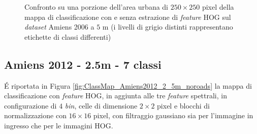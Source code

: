 \begin{figure}[!ht]

\center


\hspace{2mm}


\caption{Confronto su una porzione dell'area urbana di $250\times250$
pixel della mappa di classificazione con e senza estrazione di
\emph{feature} HOG sul \emph{dataset} Amiens 2006 a $5$ m (i livelli di grigio distinti rappresentano etichette di classi differenti)}

\label{fig:confrontoAmiens2006_5m}

\end{figure}

\clearpage





\subsection{Amiens 2012 - 2.5m - 7 classi}

\'E riportata in Figura \ref{fig:ClassMap_Amiens2012_2_5m_noroads} la
mappa di classificazione con \emph{feature} HOG, in aggiunta alle tre
\emph{feature} spettrali, in configurazione di $4$ \emph{bin}, celle di
dimensione $2\times2$ pixel e blocchi di normalizzazione con
$16\times16$ pixel, con filtraggio gaussiano sia per l'immagine in
ingresso che per le immagini HOG.

